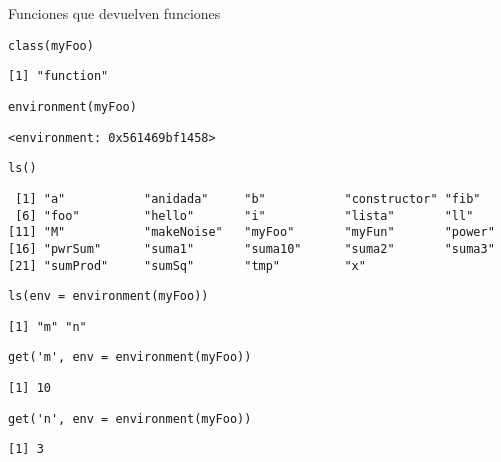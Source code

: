 \documentclass[xcolor={usenames,svgnames,dvipsnames}]{beamer}
\begin{document}
\begin{frame}[label={sec:orgaa6227e},fragile]{Funciones que devuelven funciones}
 \lstset{language=r,label= ,caption= ,captionpos=b,numbers=none}
\begin{lstlisting}
class(myFoo)
\end{lstlisting}

\begin{verbatim}
[1] "function"
\end{verbatim}


\lstset{language=r,label= ,caption= ,captionpos=b,numbers=none}
\begin{lstlisting}
environment(myFoo)
\end{lstlisting}

\begin{verbatim}
<environment: 0x561469bf1458>
\end{verbatim}


\lstset{language=r,label= ,caption= ,captionpos=b,numbers=none}
\begin{lstlisting}
ls()
\end{lstlisting}

\begin{verbatim}
 [1] "a"           "anidada"     "b"           "constructor" "fib"        
 [6] "foo"         "hello"       "i"           "lista"       "ll"         
[11] "M"           "makeNoise"   "myFoo"       "myFun"       "power"      
[16] "pwrSum"      "suma1"       "suma10"      "suma2"       "suma3"      
[21] "sumProd"     "sumSq"       "tmp"         "x"
\end{verbatim}


\lstset{language=r,label= ,caption= ,captionpos=b,numbers=none}
\begin{lstlisting}
ls(env = environment(myFoo))
\end{lstlisting}

\begin{verbatim}
[1] "m" "n"
\end{verbatim}


\lstset{language=r,label= ,caption= ,captionpos=b,numbers=none}
\begin{lstlisting}
get('m', env = environment(myFoo))
\end{lstlisting}

\begin{verbatim}
[1] 10
\end{verbatim}


\lstset{language=r,label= ,caption= ,captionpos=b,numbers=none}
\begin{lstlisting}
get('n', env = environment(myFoo))
\end{lstlisting}

\begin{verbatim}
[1] 3
\end{verbatim}
\end{frame}
\end{document}
